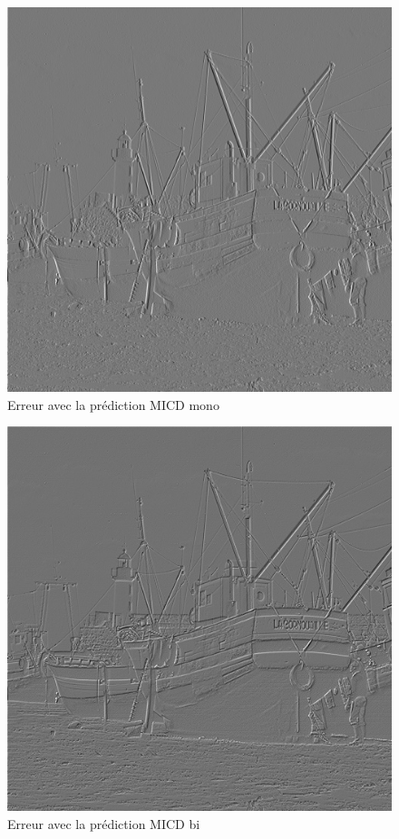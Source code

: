\documentclass[12pt]{report}
\begin{document}
\begin{figure}[H]
\begin{center}
\includegraphics[scale=0.4]{../ImageRes/ImagecodeeMICDmonoQ1.jpg} 
\caption{Erreur avec la prédiction MICD mono}
\end{center}
\end{figure}

\begin{figure}[H][H]
\begin{center}
\includegraphics[scale=0.4]{../ImageRes/ImagecodeeMICDbiQ1.jpg} 
\caption{Erreur avec la prédiction MICD bi}
\end{center}
\end{figure}
\end{document}
